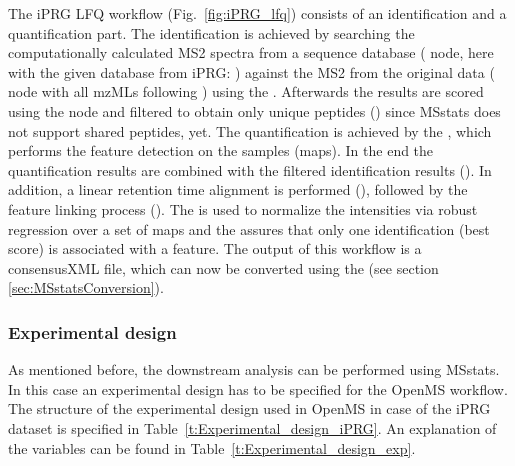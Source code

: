 \noindent The iPRG LFQ workflow (Fig.~\ref{fig:iPRG_lfq}) consists of an identification and a quantification part. The identification is achieved by searching the computationally calculated MS2 spectra from a sequence database ( node, here with the given database from iPRG:
)
against the MS2 from the original data ( node with all mzMLs following ) using the .
Afterwards the results are scored using the  node and filtered to obtain only unique peptides () since MSstats does not support shared peptides, yet. The quantification is achieved by the , which performs the feature detection on the samples (maps). In the end the quantification results are combined with the filtered identification results (). In addition, a linear retention time alignment is performed (), followed by the feature linking process (). The  is used to normalize the intensities via robust regression over a set of maps and the  assures that only one identification (best score) is associated with a feature. The output of this workflow is a consensusXML file, which can now be converted using the  (see section \ref{sec:MSstatsConversion}). 

\subsubsection{Experimental design}
\label{topic:experimental_design}
\noindent As mentioned before, the downstream analysis can be performed using MSstats. In this case an experimental design has to be specified for the OpenMS workflow. The structure of the experimental design used in OpenMS in case of the iPRG dataset is specified in Table~\ref{t:Experimental_design_iPRG}. An explanation of the variables can be found in Table~\ref{t:Experimental_design_exp}. 

